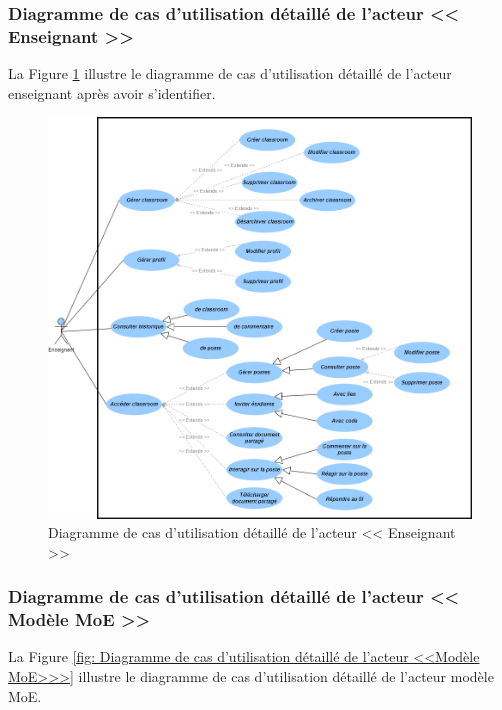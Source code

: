 \subsubsection{Diagramme de cas d’utilisation détaillé de l’acteur << Enseignant >>}
La Figure \ref{fig:diagramme de cas d’utilisation détaillé de l’acteur << Enseignant >>} illustre le diagramme de cas d’utilisation détaillé de l’acteur enseignant après avoir s’identifier.
\begin{figure}[H]
    \centering
    \includegraphics[width=1.1\textwidth,height=0.85\textheight]{images/chp3/fig4.png}
    \caption{Diagramme de cas d’utilisation détaillé de l’acteur << Enseignant >>}
    \label{fig:diagramme de cas d’utilisation détaillé de l’acteur << Enseignant >>}    
\end{figure}


\subsubsection{ Diagramme de cas d’utilisation détaillé de l’acteur << Modèle MoE >>}
La Figure \ref{fig: Diagramme de cas d’utilisation détaillé de l’acteur <<Modèle MoE>>>} illustre le diagramme de cas d’utilisation détaillé de l’acteur modèle MoE.

